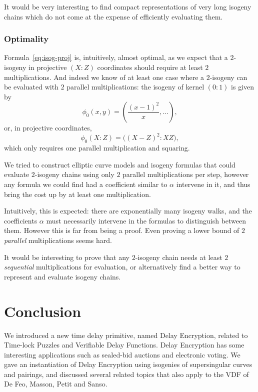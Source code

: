 \documentclass{llncs}
\begin{document}
It would be very interesting to find compact representations of very
long isogeny chains which do not come at the expense of efficiently
evaluating them.

\subsubsection{Optimality}
Formula~\eqref{eq:isog-proj} is, intuitively, almost optimal, as we
expect that a $2$-isogeny in projective $(X:Z)$ coordinates should
require at least $2$ multiplications. %
And indeed we know of at least one case where a $2$-isogeny can be
evaluated with $2$ parallel multiplications: the isogeny of kernel
$(0:1)$ is given by
\begin{equation}
  \label{eq:isog-special}
  \phi_0(x,y) = \left(\frac{(x - 1)^2}{x}, \dots\right),
\end{equation}
or, in projective coordinates,
\begin{equation}
  \label{eq:isog-special-proj}
  \phi_0(X:Z) = \bigl((X - Z)^2:XZ\bigr),
\end{equation}
which only requires one parallel multiplication and squaring.

We tried to construct elliptic curve models and isogeny formulas that
could evaluate $2$-isogeny chains using only $2$ parallel
multiplications per step, however any formula we could find had a
coefficient similar to $\alpha$ intervene in it, and thus bring the
cost up by at least one multiplication.

Intuitively, this is expected: there are exponentially many isogeny
walks, and the coefficients $\alpha$ must necessarily intervene in the
formulas to distinguish between them. %
However this is far from being a proof. %
Even proving a lower bound of $2$ \emph{parallel} multiplications
seems hard.

It would be interesting to prove that any $2$-isogeny chain needs at
least $2$ \emph{sequential} multiplications for evaluation, or
alternatively find a better way to represent and evaluate isogeny
chains.


\section{Conclusion}

We introduced a new time delay primitive, named Delay Encryption,
related to Time-lock Puzzles and Verifiable Delay Functions. %
Delay Encryption has some interesting applications such as sealed-bid
auctions and electronic voting. %
We gave an instantiation of Delay Encryption using isogenies of
supersingular curves and pairings, and discussed several related
topics that also apply to the VDF of De Feo, Masson, Petit and Sanso.
\end{document}
